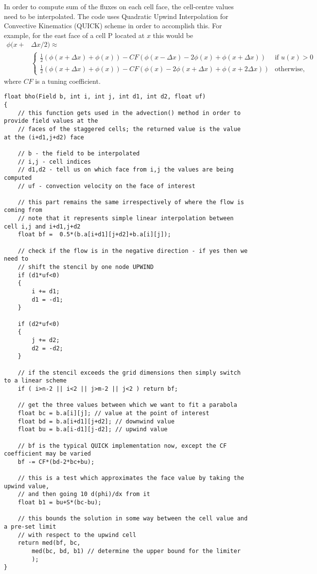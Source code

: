 \documentclass[notitlepage]{article}
\begin{document}
In order to compute sum of the fluxes on each cell face, the cell-centre values
need to be interpolated.
The code uses Quadratic Upwind Interpolation for Convective Kinematics (QUICK) scheme in order to accomplish this. 
For example, for the east face of a cell P located at $x$ this would be
%
\begin{equation}
\begin{aligned}
\phi(x+&\Delta x/2) \approx \\
&\begin{cases}
	\frac{1}{2}(\phi(x + \Delta x) + \phi(x)) - CF (\phi(x- \Delta x) -2 \phi(x) + \phi(x+\Delta x)) & \mbox{if } u(x)>0 \\
	\frac{1}{2}(\phi(x + \Delta x) + \phi(x)) - CF (\phi(x) -2 \phi(x+\Delta x) + \phi(x+2\Delta x)) & \mbox{otherwise,}
\end{cases} 
\end{aligned}
\end{equation}
%
where $CF$ is a tuning coefficient.

\begin{lstlisting}[style=myCpp]
float bho(Field b, int i, int j, int d1, int d2, float uf)
{
	// this function gets used in the advection() method in order to provide field values at the
	// faces of the staggered cells; the returned value is the value at the (i+d1,j+d2) face
		
	// b - the field to be interpolated
	// i,j - cell indices
	// d1,d2 - tell us on which face from i,j the values are being computed
	// uf - convection velocity on the face of interest
	
	// this part remains the same irrespectively of where the flow is coming from
	// note that it represents simple linear interpolation between cell i,j and i+d1,j+d2
	float bf =  0.5*(b.a[i+d1][j+d2]+b.a[i][j]);
	
	// check if the flow is in the negative direction - if yes then we need to
	// shift the stencil by one node UPWIND
	if (d1*uf<0)
	{
		i += d1; 
		d1 = -d1;
	}
	
	if (d2*uf<0)
	{
		j += d2;
		d2 = -d2;
	}
	
	// if the stencil exceeds the grid dimensions then simply switch to a linear scheme
	if ( i>n-2 || i<2 || j>m-2 || j<2 ) return bf;
	
	// get the three values between which we want to fit a parabola
	float bc = b.a[i][j]; // value at the point of interest
	float bd = b.a[i+d1][j+d2]; // downwind value
	float bu = b.a[i-d1][j-d2]; // upwind value
	
	// bf is the typical QUICK implementation now, except the CF coefficient may be varied
	bf -= CF*(bd-2*bc+bu);
	
	// this is a test which approximates the face value by taking the upwind value,
	// and then going 10 d(phi)/dx from it
	float b1 = bu+S*(bc-bu);
	
	// this bounds the solution in some way between the cell value and a pre-set limit
	// with respect to the upwind cell
	return med(bf, bc,
		med(bc, bd, b1) // determine the upper bound for the limiter
		);
}
\end{lstlisting}
\end{document}
